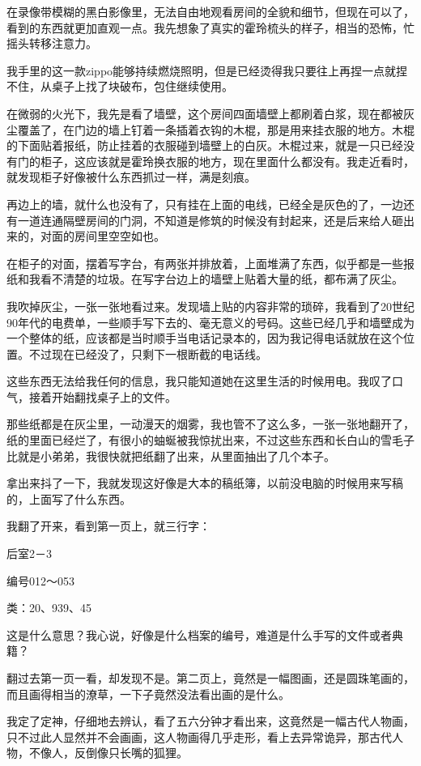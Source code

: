 在录像带模糊的黑白影像里，无法自由地观看房间的全貌和细节，但现在可以了，看到的东西就更加直观一点。我先想象了真实的霍玲梳头的样子，相当的恐怖，忙摇头转移注意力。

我手里的这一款zippo能够持续燃烧照明，但是已经烫得我只要往上再捏一点就捏不住，从桌子上找了块破布，包住继续使用。

在微弱的火光下，我先是看了墙壁，这个房间四面墙壁上都刷着白浆，现在都被灰尘覆盖了，在门边的墙上钉着一条插着衣钩的木棍，那是用来挂衣服的地方。木棍的下面贴着报纸，防止挂着的衣服碰到墙壁上的白灰。木棍过来，就是一只已经没有门的柜子，这应该就是霍玲换衣服的地方，现在里面什么都没有。我走近看时，就发现柜子好像被什么东西抓过一样，满是刻痕。

再边上的墙，就什么也没有了，只有挂在上面的电线，已经全是灰色的了，一边还有一道连通隔壁房间的门洞，不知道是修筑的时候没有封起来，还是后来给人砸出来的，对面的房间里空空如也。

在柜子的对面，摆着写字台，有两张并排放着，上面堆满了东西，似乎都是一些报纸和我看不清楚的垃圾。在写字台边上的墙壁上贴着大量的纸，都布满了灰尘。

我吹掉灰尘，一张一张地看过来。发现墙上贴的内容非常的琐碎，我看到了20世纪90年代的电费单，一些顺手写下去的、毫无意义的号码。这些已经几乎和墙壁成为一个整体的纸，应该都是当时顺手当电话记录本的，因为我记得电话就放在这个位置。不过现在已经没了，只剩下一根断截的电话线。

这些东西无法给我任何的信息，我只能知道她在这里生活的时候用电。我叹了口气，接着开始翻找桌子上的文件。

那些纸都是在灰尘里，一动漫天的烟雾，我也管不了这么多，一张一张地翻开了，纸的里面已经烂了，有很小的蚰蜒被我惊扰出来，不过这些东西和长白山的雪毛子比就是小弟弟，我很快就把纸翻了出来，从里面抽出了几个本子。

拿出来抖了一下，我就发现这好像是大本的稿纸簿，以前没电脑的时候用来写稿的，上面写了什么东西。

我翻了开来，看到第一页上，就三行字：

后室2－3

编号012～053

类：20、939、45

这是什么意思？我心说，好像是什么档案的编号，难道是什么手写的文件或者典籍？

翻过去第一页一看，却发现不是。第二页上，竟然是一幅图画，还是圆珠笔画的，而且画得相当的潦草，一下子竟然没法看出画的是什么。

我定了定神，仔细地去辨认，看了五六分钟才看出来，这竟然是一幅古代人物画，只不过此人显然并不会画画，这人物画得几乎走形，看上去异常诡异，那古代人物，不像人，反倒像只长嘴的狐狸。

